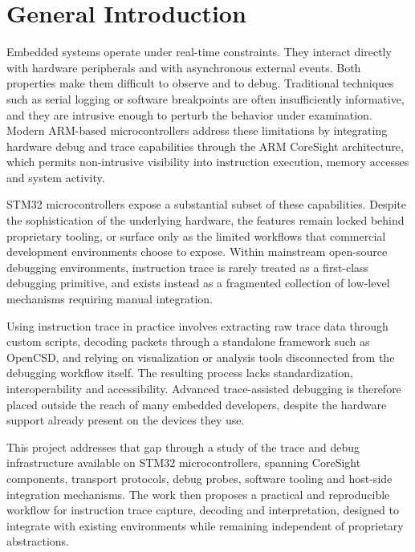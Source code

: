 \chapter*{General Introduction}

Embedded systems operate under real-time constraints. They interact directly with hardware peripherals and with asynchronous external events. Both properties make them difficult to observe and to debug. Traditional techniques such as serial logging or software breakpoints are often insufficiently informative, and they are intrusive enough to perturb the behavior under examination. Modern ARM-based microcontrollers address these limitations by integrating hardware debug and trace capabilities through the ARM CoreSight architecture, which permits non-intrusive visibility into instruction execution, memory accesses and system activity.

STM32 microcontrollers expose a substantial subset of these capabilities. Despite the sophistication of the underlying hardware, the features remain locked behind proprietary tooling, or surface only as the limited workflows that commercial development environments choose to expose. Within mainstream open-source debugging environments, instruction trace is rarely treated as a first-class debugging primitive, and exists instead as a fragmented collection of low-level mechanisms requiring manual integration.

Using instruction trace in practice involves extracting raw trace data through custom scripts, decoding packets through a standalone framework such as OpenCSD\cite{opencsd}, and relying on visualization or analysis tools disconnected from the debugging workflow itself. The resulting process lacks standardization, interoperability and accessibility. Advanced trace-assisted debugging is therefore placed outside the reach of many embedded developers, despite the hardware support already present on the devices they use.

This project addresses that gap through a study of the trace and debug infrastructure available on STM32 microcontrollers, spanning CoreSight components, transport protocols, debug probes, software tooling and host-side integration mechanisms. The work then proposes a practical and reproducible workflow for instruction trace capture, decoding and interpretation, designed to integrate with existing environments while remaining independent of proprietary abstractions.

